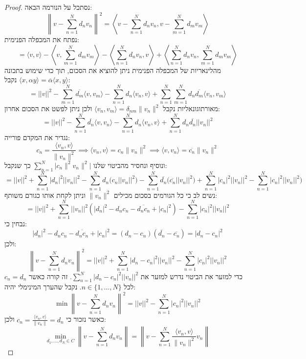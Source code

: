 \documentclass{tstextbook}
\begin{document}
\begin{proof}
נסתכל על הנורמה הבאה:
$$\left\lVert v-\sum_{n=1}^{N}d_{n}v_{n}\right\rVert ^{2}=\left\langle v-\sum_{n=1}^{N}d_{n}v_{n},v-\sum_{m=1}^{N}d_{m}v_{m}\right\rangle$$
נפתח את המכפלה הפנימית:
$$=\langle v,v\rangle-\left\langle v,\sum_{m=1}^{N}d_{m}v_{m}\right\rangle-\left\langle\sum_{n=1}^{N}d_{n}v_{n},v\right\rangle+\left\langle\sum_{n=1}^{N}d_{n}v_{n},\sum_{m=1}^{N}d_{m}v_{m}\right\rangle$$
מהלינאריות של המכפלה הפנימית ניתן להוציא את הסכום, תוך כדי שימוש בתכונה \(\langle x,\alpha y \rangle=\overline{\alpha}\langle x,y \rangle\) נקבל:
$$=||v||^{2}-\sum_{m=1}^{N}\overline{{{d_{m}}}}\langle v,v_{m}\rangle-\sum_{n=1}^{N}d_{n}\langle v_{n},v\rangle+\sum_{n=1}^{N}\sum_{m=1}^{N}d_{n}\overline{{{d_{m}}}}\langle v_{n},v_{m}\rangle$$
מאורתוגונאליות נקבל \(\langle v_{n},v_{m} \rangle=\delta_{nm}\lVert v_{n} \rVert^{2}\) ולכן ניתן לפשט את הסכום אחרון:
$$=||v||^{2}-\sum_{n=1}^{N}\overline{{{d_{n}}}}\langle v,v_{n}\rangle-\sum_{n=1}^{N}d_{n}\langle v_{n},v\rangle+\sum_{n=1}^{N}d_{n}\overline{{{d_{n}}}}||v_{n}||^{2}$$
נגדיר את המקדם פורייה:
$$c_{n}=\frac{\langle v_{n},v \rangle}{\lVert v_{n} \rVert ^{2}}\implies \langle v_{n},v \rangle =c_{n}\lVert v_{n} \rVert ^{2}\implies \langle v,v_{n} \rangle =\overline{c_{n}} \lVert v_{n} \rVert ^{2}$$
ונוסיף ונחסיר מהביטוי שלנו \(\sum_{n=1}^{N}\lvert c_{n}\lVert^{2} v_{n} \rVert^{2} \rvert\) כך שנקבל:
$$=||v||^{2}+\sum_{n=1}^{N}|d_{n}|^{2}||v_{n}||^{2}-\sum_{n=1}^{N}d_{n}\big(c_{n}||v_{n}||^{2}\big)-\sum_{n=1}^{N}\overline{{{d_{n}}}}\big(\overline{{{c_{n}}}}||v_{n}||^{2}\big)+\sum_{n=1}^{N}|c_{n}|^{2}||v_{n}||^{2}-\sum_{n=1}^{N}|c_{n}|^{2}||v_{n}||^{2}\big)$$
נשים לב כי כל הגורמים בסכום מכילים \(\lVert v_{n} \rVert^{2}\) וניתן לקחת אותו כגורם משותף:
$$=||v||^{2}+\sum_{n=1}^{N}||v_{n}||^{2}\left(|d_{n}|^{2}-d_{n}c_{n}-\overline{{{d_{n}c_{n}}}}+|c_{n}|^{2}\right)-\sum_{n=1}^{N}|c_{n}|^{2}||v_{n}||^{2}$$
נבחין כי:
$$|d_{n}|^{2}-d_{n}c_{n}-{\overline{{d_{n}c_{n}}}}+|c_{n}|^{2}=(d_{n}-c_{n})({\overline{{d_{n}}}}-{\overline{{c_{n}}}})=|d_{n}-c_{n}|^{2}$$
ולכן:
$$\left\lVert v-\sum_{n=1}^{N}d_{n}v_{n}\right\rVert ^{2}=||v||^{2}+\sum_{n=1}^{N}|d_{n}-c_{n}|^{2}||v_{n}||^{2}-\sum_{n=1}^{N}|c_{n}|^{2}||v_{n}||^{2}$$
כדי למזער את הביטוי נדרש למזער את \(\textstyle\sum_{n=1}^{N}|d_{n}-c_{n}|^{2}||v_{n}||^{2}\). זה קורה כאשר \(c_{n}=d_{n}\) לכל \(n \in \{ 1,\dots ,N \}\). נקבל שהערך המינימלי יהיה:
$$\operatorname*{min}\left\lVert v-\sum_{n=1}^{N}d_{n}v_{n}\right\rVert ^{2}=||v||^{2}-\sum_{n=1}^{N}|c_{n}|^{2}||v_{n}||^{2}$$
כאשר נזכור כי \(c_{n}=\frac{\langle v_{n},v \rangle}{\lVert v_{n} \rVert}=d_{n}\) ולכן:
$$\operatorname*{min}_{d_{1},\ldots,d_{N}\in C}\left\lVert v-\sum_{n=1}^{N}d_{n}v_{n}\right\rVert =\left\lVert v-\sum_{n=1}^{N}{\frac{\langle v_{n},v\rangle}{\|v_{n}\|^{2}}}v_{n}\right\rVert $$

\end{proof}
\end{document}
